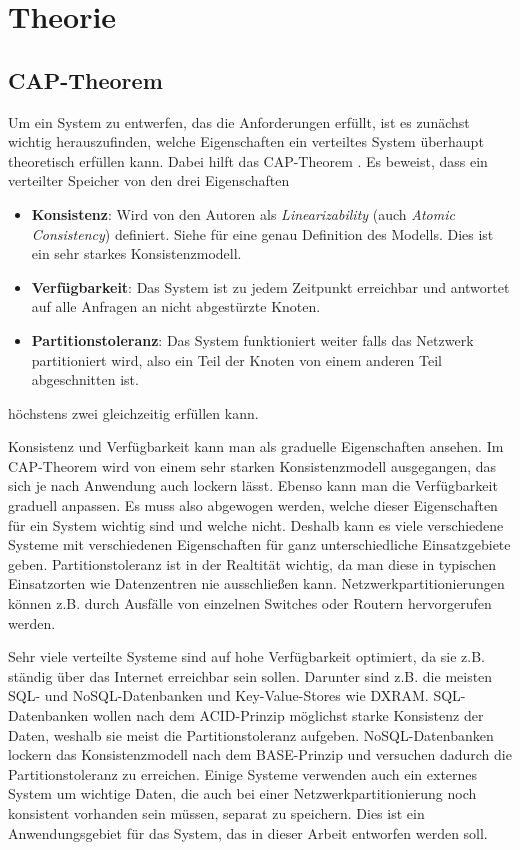\chapter{Theorie}
\label{theory}

\section{CAP-Theorem}
\label{cap}

Um ein System zu entwerfen, das die Anforderungen erfüllt, ist es zunächst wichtig herauszufinden, welche Eigenschaften ein verteiltes System überhaupt theoretisch erfüllen kann. Dabei hilft das CAP-Theorem \cite{cap}. Es beweist, dass ein verteilter Speicher von den drei Eigenschaften 
\begin{itemize}
	\item \textbf{Konsistenz}: Wird von den Autoren als \textit{Linearizability} (auch \textit{Atomic Consistency}) definiert. Siehe \cite{linearizability} für eine genau Definition des Modells. Dies ist ein sehr starkes Konsistenzmodell.
	\item \textbf{Verfügbarkeit}: Das System ist zu jedem Zeitpunkt erreichbar und antwortet auf alle Anfragen an nicht abgestürzte Knoten.
	\item \textbf{Partitionstoleranz}: Das System funktioniert weiter falls das Netzwerk partitioniert wird, also ein Teil der Knoten von einem anderen Teil abgeschnitten ist.
\end{itemize}
 höchstens zwei gleichzeitig erfüllen kann. 

Konsistenz und Verfügbarkeit kann man als graduelle Eigenschaften ansehen. Im CAP-Theorem wird von einem sehr starken Konsistenzmodell ausgegangen, das sich je nach Anwendung auch lockern lässt. Ebenso kann man die Verfügbarkeit graduell anpassen. Es muss also abgewogen werden, welche dieser Eigenschaften für ein System wichtig sind und welche nicht. Deshalb kann es viele verschiedene Systeme mit verschiedenen Eigenschaften für ganz unterschiedliche Einsatzgebiete geben. Partitionstoleranz ist in der Realtität wichtig, da man diese in typischen Einsatzorten wie Datenzentren nie ausschließen kann. Netzwerkpartitionierungen können z.B. durch Ausfälle von einzelnen Switches oder Routern hervorgerufen werden. 

Sehr viele verteilte Systeme sind auf hohe Verfügbarkeit optimiert, da sie z.B. ständig über das Internet erreichbar sein sollen. Darunter sind z.B. die meisten SQL- und NoSQL-Datenbanken und Key-Value-Stores wie DXRAM. SQL-Datenbanken wollen nach dem ACID-Prinzip möglichst starke Konsistenz der Daten, weshalb sie meist die Partitionstoleranz aufgeben. NoSQL-Datenbanken lockern das Konsistenzmodell nach dem BASE-Prinzip und versuchen dadurch die Partitionstoleranz zu erreichen. Einige Systeme verwenden auch ein externes System um wichtige Daten, die auch bei einer Netzwerkpartitionierung noch konsistent vorhanden sein müssen, separat zu speichern. Dies ist ein Anwendungsgebiet für das System, das in dieser Arbeit entworfen werden soll.

